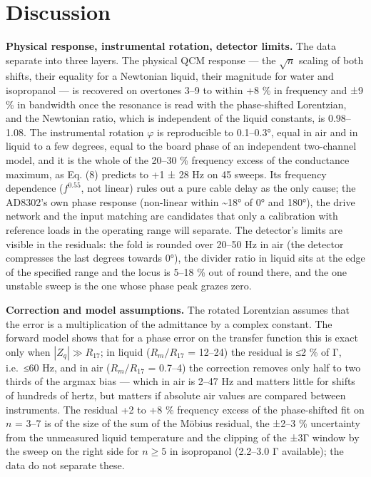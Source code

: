 \documentclass[11pt,a4paper]{article}
\begin{document}
\hypertarget{discussion}{%
\section{Discussion}\label{discussion}}

\textbf{Physical response, instrumental rotation, detector limits.} The
data separate into three layers. The physical QCM response --- the
\(\sqrt n\) scaling of both shifts, their equality for a Newtonian
liquid, their magnitude for water and isopropanol --- is recovered on
overtones 3--9 to within +8 \% in frequency and ±9 \% in bandwidth once
the resonance is read with the phase-shifted Lorentzian, and the
Newtonian ratio, which is independent of the liquid constants, is
0.98--1.08. The instrumental rotation \(\varphi\) is reproducible to
0.1--0.3°, equal in air and in liquid to a few degrees, equal to the
board phase of an independent two-channel model, and it is the whole of
the 20--30 \% frequency excess of the conductance maximum, as Eq. (8)
predicts to +1 ± 28 Hz on 45 sweeps. Its frequency dependence
(\(f^{0.55}\), not linear) rules out a pure cable delay as the only
cause; the AD8302's own phase response (non-linear within
\textasciitilde18° of 0° and 180°), the drive network and the input
matching are candidates that only a calibration with reference loads in
the operating range will separate. The detector's limits are visible in
the residuals: the fold is rounded over 20--50 Hz in air (the detector
compresses the last degrees towards 0°), the divider ratio in liquid
sits at the edge of the specified range and the locus is 5--18 \% out of
round there, and the one unstable sweep is the one whose phase peak
grazes zero.

\textbf{Correction and model assumptions.} The rotated Lorentzian
assumes that the error is a multiplication of the admittance by a
complex constant. The forward model shows that for a phase error on the
transfer function this is exact only when \(|Z_q| \gg R_{17}\); in
liquid (\(R_m/R_{17}\) = 12--24) the residual is ≤2 \% of Γ, i.e.~≤60
Hz, and in air (\(R_m/R_{17}\) = 0.7--4) the correction removes only
half to two thirds of the argmax bias --- which in air is 2--47 Hz and
matters little for shifts of hundreds of hertz, but matters if absolute
air values are compared between instruments. The residual +2 to +8 \%
frequency excess of the phase-shifted fit on \(n\) = 3--7 is of the size
of the sum of the Möbius residual, the ±2--3 \% uncertainty from the
unmeasured liquid temperature and the clipping of the ±3Γ window by the
sweep on the right side for \(n \ge 5\) in isopropanol (2.2--3.0 Γ
available); the data do not separate these.
\end{document}

